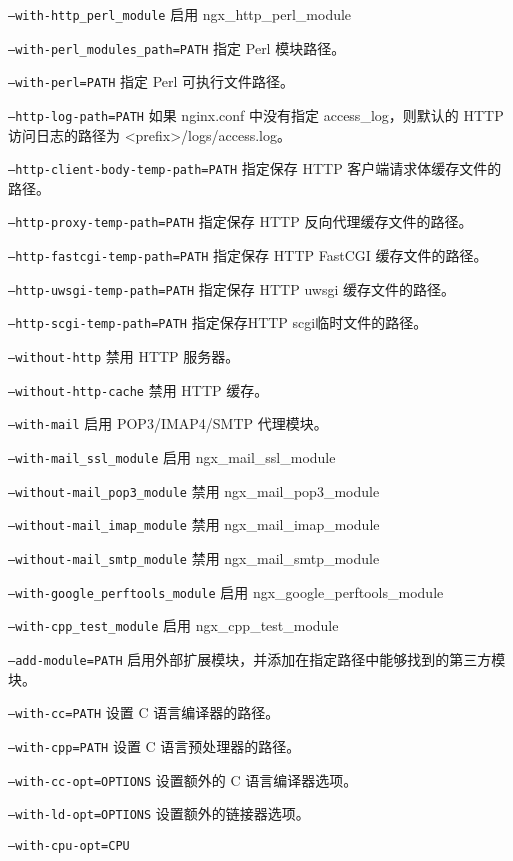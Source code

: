 \begin{compactitem}
\item \texttt{--with-http\_perl\_module}
启用 ngx\_http\_perl\_module
\item \texttt{--with-perl\_modules\_path=PATH}
指定 Perl 模块路径。
\item \texttt{--with-perl=PATH}
指定 Perl 可执行文件路径。
\item \texttt{--http-log-path=PATH}
如果 nginx.conf 中没有指定 access\_log，则默认的 HTTP 访问日志的路径为 <prefix>/logs/access.log。
\item \texttt{--http-client-body-temp-path=PATH}
指定保存 HTTP 客户端请求体缓存文件的路径。
\item \texttt{--http-proxy-temp-path=PATH}
指定保存 HTTP 反向代理缓存文件的路径。
\item \texttt{--http-fastcgi-temp-path=PATH}
指定保存 HTTP FastCGI 缓存文件的路径。
\item \texttt{--http-uwsgi-temp-path=PATH}
指定保存 HTTP uwsgi 缓存文件的路径。
\item \texttt{--http-scgi-temp-path=PATH}
指定保存HTTP scgi临时文件的路径。
\item \texttt{--without-http}
禁用 HTTP 服务器。
\item \texttt{--without-http-cache}
禁用 HTTP 缓存。
\item \texttt{--with-mail}
启用 POP3/IMAP4/SMTP 代理模块。
\item \texttt{--with-mail\_ssl\_module}
启用 ngx\_mail\_ssl\_module
\item \texttt{--without-mail\_pop3\_module}
禁用 ngx\_mail\_pop3\_module
\item \texttt{--without-mail\_imap\_module}
禁用 ngx\_mail\_imap\_module
\item \texttt{--without-mail\_smtp\_module}
禁用 ngx\_mail\_smtp\_module
\item \texttt{--with-google\_perftools\_module}
启用 ngx\_google\_perftools\_module
\item \texttt{--with-cpp\_test\_module}
启用 ngx\_cpp\_test\_module
\item \texttt{--add-module=PATH}
启用外部扩展模块，并添加在指定路径中能够找到的第三方模块。
\item \texttt{--with-cc=PATH}
设置 C 语言编译器的路径。
\item \texttt{--with-cpp=PATH}
设置 C 语言预处理器的路径。
\item \texttt{--with-cc-opt=OPTIONS}
设置额外的 C 语言编译器选项。
\item \texttt{--with-ld-opt=OPTIONS}
设置额外的链接器选项。
\item \texttt{--with-cpu-opt=CPU}

\end{compactitem}
